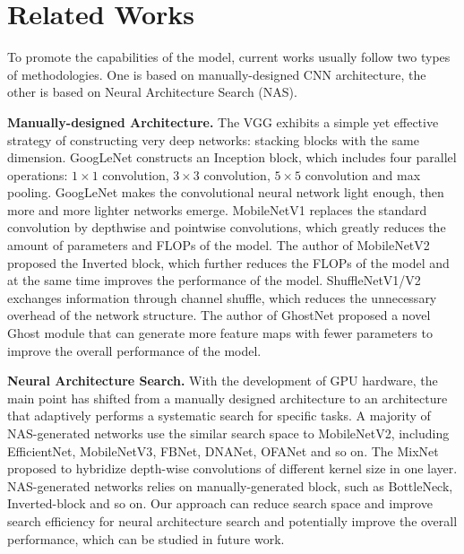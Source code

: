 \documentclass[final]{cvpr}
\begin{document}
\section{Related Works}

To promote the capabilities of the model, current
works usually follow two types of methodologies. One is based on manually-designed CNN architecture, the other is based on Neural Architecture Search (NAS)\cite{zoph2016neural}.
 
 \textbf{Manually-designed Architecture.}  The VGG\cite{VGG} exhibits a simple yet effective strategy of constructing very deep networks: stacking blocks with the same dimension. GoogLeNet\cite{inceptionv1} constructs an Inception block, which includes four parallel operations: $1\times1$ convolution, $3\times3$ convolution, $5\times5$ convolution and max pooling. GoogLeNet makes the convolutional neural network light enough, then more and more lighter networks emerge. MobileNetV1\cite{mobilenetv1} replaces the standard convolution by depthwise and pointwise convolutions, which greatly reduces the amount of parameters and FLOPs of the model. The author of MobileNetV2\cite{mobilenetv2} proposed the Inverted block, which further reduces the FLOPs of the model and at the same time improves the performance of the model. ShuffleNetV1/V2\cite{shufflenet}\cite{shufflenetv2} exchanges information through channel shuffle, which reduces the unnecessary overhead of the network structure. The author of GhostNet\cite{ghostnet} proposed a novel Ghost module that can generate more feature maps with fewer parameters to improve the overall performance of the model.
 

\textbf{Neural Architecture Search.} With the development of GPU hardware, the main point has shifted from a manually designed architecture to an architecture that adaptively performs a systematic search for specific tasks. A majority of NAS-generated networks use the similar search space to  MobileNetV2\cite{mobilenetv2}, including EﬃcientNet\cite{efficientnet}, MobileNetV3\cite{mbv3}, FBNet\cite{fbnet}, DNANet\cite{dnanet}, OFANet\cite{ofanet} and so on. The MixNet\cite{mixnet} proposed to hybridize depth-wise convolutions of diﬀerent kernel size in one layer. NAS-generated networks relies on manually-generated block, such as BottleNeck\cite{resnet}, Inverted-block\cite{mobilenetv2} and so on. Our approach can reduce search space and improve search efficiency for neural architecture search and potentially improve the overall performance, which can be studied in future work.
\end{document}
